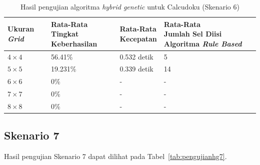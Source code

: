\begin{table}
\centering
\captionsetup{justification=centering}
\caption[Hasil pengujian algoritma \textit{hybrid genetic} untuk Calcudoku (Skenario 6)]{Hasil pengujian algoritma \textit{hybrid genetic} untuk Calcudoku (Skenario 6)}
\begin{tabular}{| l | l | l | l |}
\hline
Ukuran \textit{Grid} & \makecell[c]{Rata-Rata \\ Tingkat Keberhasilan} & \makecell[c]{Rata-Rata \\ Kecepatan} & \makecell[c]{Rata-Rata \\ Jumlah Sel Diisi Algoritma \textit{Rule Based}} \\
\hline \hline
\begin{math}4 \times 4\end{math} & 56.41\% & 0.532 detik & 5 \\
\hline
\begin{math}5 \times 5\end{math} & 19.231\% & 0.339 detik & 14 \\
\hline
\begin{math}6 \times 6\end{math} & 0\% & - & - \\
\hline
\begin{math}7 \times 7\end{math} & 0\% & - & - \\
\hline
\begin{math}8 \times 8\end{math} & 0\% & - & - \\
\hline
\end{tabular}
\label{tab:pengujianhg6}
\end{table}

\subsection{Skenario 7}
\label{sec:skenario7}

Hasil pengujian Skenario 7 dapat dilihat pada Tabel~\ref{tab:pengujianhg7}.

